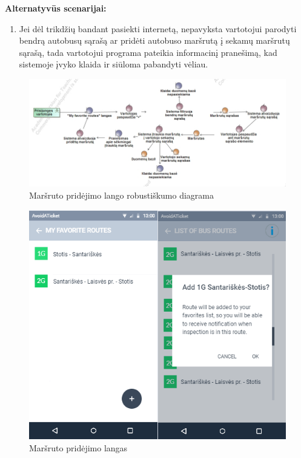 \documentclass{VUMIFPSkursinis}
\begin{document}
	\textbf{Alternatyvūs scenarijai:}
	\begin{enumerate}[itemsep=-2mm]
		\item Jei dėl trikdžių bandant pasiekti internetą, nepavyksta vartotojui parodyti bendrą autobusų sąrašą ar pridėti autobuso maršrutą į sekamų maršrutų sąrašą, tada vartotojui programa pateikia informacinį pranešimą, kad sistemoje įvyko klaida ir siūloma pabandyti vėliau.
	\end{enumerate} 
		\begin{figure}[H]
				\centering
				\includegraphics[scale=0.5]{img/marsruto_pridejimas_i_sekamu_sarasa}
				\caption{Maršruto pridėjimo lango robustiškumo diagrama}
				\label{img:Maršruto pridėjimo langas RD}
			\end{figure}
	\begin{figure}[H]
				\centering
				\includegraphics[scale=1.5]{img/mockup_AddRoute}
				\caption{Maršruto pridėjimo langas}
				\label{img:Maršruto pridėjimo langas}
			\end{figure}
\end{document}
